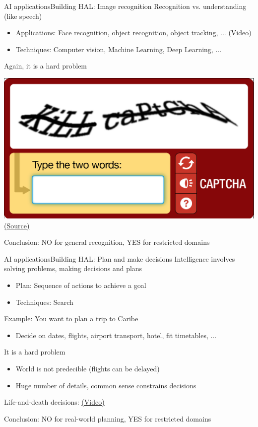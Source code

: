 \documentclass[10pt,compress]{beamer} %
\begin{document}
\begin{frame}{AI applications}{Building HAL: Image recognition}
	Recognition vs. understanding (like speech)
	\begin{itemize}
		\item Applications: Face recognition, object recognition, object tracking, ... \href{https://www.youtube.com/watch?v=y5NWCjMbOZk}{(Video)}
		\item Techniques: Computer vision, Machine Learning, Deep Learning, ...
	\end{itemize}
	Again, it is a hard problem
	\begin{center}
		\includegraphics[width=0.25\linewidth]{figs/captcha.png}\\
		\tiny{\href{http://www.ohmygeek.net/2015/03/12/podec-troyano-captcha/}{(Source)}}
	\end{center}

	Conclusion: NO for general recognition, YES for restricted domains
\end{frame}

\begin{frame}{AI applications}{Building HAL: Plan and make decisions}
	Intelligence involves solving problems, making decisions and plans
	\begin{itemize}
		\item Plan: Sequence of actions to achieve a goal
		\item Techniques: Search
	\end{itemize}
	Example: You want to plan a trip to Caribe
	\begin{itemize}
		\item Decide on dates, flights, airport transport, hotel, fit timetables, ...
	\end{itemize}
	It is a hard problem
	\begin{itemize}
		\item World is not predecible (flights can be delayed)
		\item Huge number of details, common sense constrains decisions
	\end{itemize}
	Life-and-death decisions: \href{https://www.youtube.com/watch?v=ixIoDYVfKA0}{(Video)}

	Conclusion: NO for real-world planning, YES for restricted domains
\end{frame}
\end{document}
